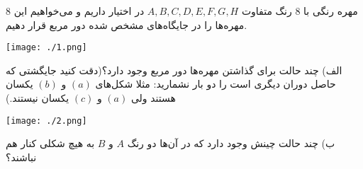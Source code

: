 \EXERCISE
$8$
 مهره رنگی با 
$8$
  رنگ متفاوت 
$A, B, C, D, E, F, G, H$
در اختیار داریم و می‌خواهیم این مهره‌ها را در جایگاه‌های مشخص شده دور مربع قرار دهیم.
    \begin{center}
     	\texttt{[image: ./1.png]}
    \end{center}
الف) چند حالت برای گذاشتن مهره‌ها دور مربع وجود دارد؟(دقت کنید جایگشتی که حاصل دوران دیگری است را دو بار نشمارید: مثلا شکل‌های $(a)$ و $(b)$ یکسان هستند ولی $(a)$ و $(c)$ یکسان نیستند.)
\begin{center}
	\texttt{[image: ./2.png]}
\end{center}
ب) چند حالت چینش وجود دارد که در آن‌ها دو رنگ $A$ و $B$ به هیچ شکلی کنار هم نباشند؟